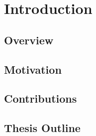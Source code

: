 \chapter{Introduction} \label{chap:intro}
\section{Overview} \label{sec:intro-overview}

\section{Motivation} \label{sec:intro-motivation}

\section{Contributions} \label{sec:intro-contr}

\section{Thesis Outline} \label{sec:intro-thesisOutline}